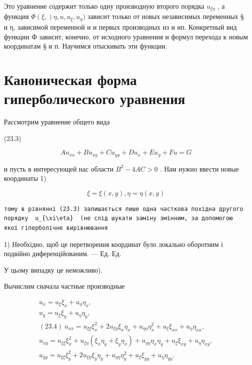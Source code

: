 \documentclass[
  ukrainian,
]{article}
\begin{document}
Это уравнение содержит только одну производную второго порядка
\(u_{\xi\eta}\) , а функция \(\Phi(\xi,) \eta,u,u_{\xi},u_{\eta})\)
зависит только от новых независимых переменных § и η, зависимой
переменной и и первых производных из и ип. Конкретный вид функции Ф
зависит, конечно, от исходного уравнения и формул перехода к новым
координатам § и п. Научимся отыскивать эти функции.

\section{Каноническая форма гиперболического
уравнения}\label{ux43aux430ux43dux43eux43dux438ux447ux435ux441ux43aux430ux44f-ux444ux43eux440ux43cux430-ux433ux438ux43fux435ux440ux431ux43eux43bux438ux447ux435ux441ux43aux43eux433ux43e-ux443ux440ux430ux432ux43dux435ux43dux438ux44f}

Рассмотрим уравнение общего вида

(23.3)

\[
Au_{xx} + Bu_{xy} + Cu_{yy} + Du_x + Eu_y + Fu = G
\]

и пусть в интересующей нас области \(B^2 - 4AC > 0\) . Нам нужно ввести
новые координаты 1)

\[
\xi = \xi(x, y),
\eta = \eta(x, y)
\]

\begin{verbatim}
тому в рівнянні (23.3) залишається лише одна часткова похідна другого порядку  u_{\xi\eta}  (не слід шукати заміну змінним, за допомогою якої гіперболічне вирівнювання
\end{verbatim}

1) Необхідно, щоб це перетворення координат було локально оборотним і
подвійно диференційованим. --- Ед. Ед.

У цьому випадку це неможливо).

Вычислим сначала частные производные

\[
\begin{array}{c} u_x = u_\xi \xi_x + u_\eta \eta_x, \\ u_y = u_\xi \xi_y + u_\eta \eta_y, \\ (23.4) \ u_{xx} = u_{\xi\xi} \xi_x^2 + 2u_{\xi\eta} \xi_x \eta_x + u_{\eta\eta} \eta_x^2 + u_{\xi} \xi_{xx} + u_{\eta} \eta_{xx}, \\ u_{xy} = u_{\xi\xi} \xi_x^2 + u_{\xi\eta} (\xi_x \eta_y + \xi_y \eta_x) + u_{\eta\eta} \eta_x \eta_y + u_{\xi} \xi_{xy} + u_{\eta} \eta_{xy}, \\ u_{yy} = u_{\xi\xi} \xi_y^2 + 2u_{\xi\eta} \xi_y \eta_y + u_{\eta\eta} \eta_y^2 + u_{\xi} \xi_{yy} + u_{\eta} \eta_{yy}. \end{array}
\]
\end{document}
